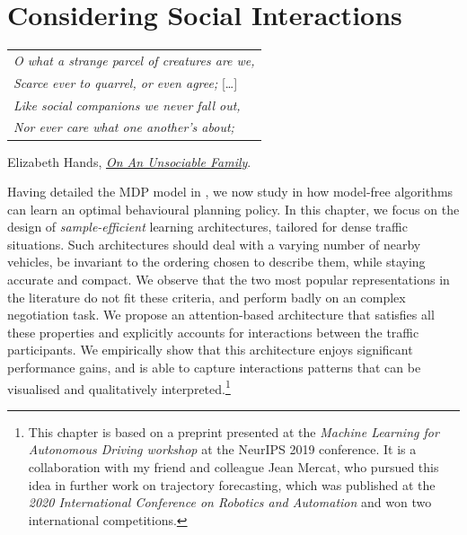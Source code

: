 
\graphicspath{{2-Chapters/4-Chapter/}}


\chapter{Considering Social Interactions}
\label{chapter:4}


\begin{flushright}
	\begin{tabular}{@{}l@{}}
		\emph{O what a strange parcel of creatures are we,}\\
		\emph{Scarce ever to quarrel, or even agree;} [\dots]\\
		\emph{Like social companions we never fall out,}\\
		\emph{Nor ever care what one another’s about;}\\
	\end{tabular}
	
	Elizabeth Hands, \href{https://eleurent.github.io/sisyphe/texts/unsociable_family.html}{\emph{On An Unsociable Family}}.
\end{flushright}

\abstractStartChapter{}%
Having detailed the \gls{MDP} model in , we now study in  how \gls{model-free}  algorithms can learn an optimal behavioural planning policy. In this chapter, we focus on the design of \emph{sample-efficient} learning architectures, tailored for dense traffic situations. Such architectures should deal with a varying number of nearby vehicles, be invariant to the ordering chosen to describe them, while staying accurate and compact. We observe that the two most popular representations in the literature do not fit these criteria, and perform badly on an complex negotiation task. We propose an attention-based architecture that satisfies all these properties and explicitly accounts for interactions between the traffic participants. We empirically show that this architecture enjoys significant performance gains, and is able to capture interactions patterns that can be visualised and qualitatively interpreted.\footnote{This chapter is based on a preprint \citep{Leurent2019social} presented at the \emph{Machine Learning for Autonomous Driving workshop} at the NeurIPS 2019 conference. It is a collaboration with my friend and colleague Jean Mercat, who pursued this idea in further work on trajectory forecasting, which was published at the \emph{2020 International Conference on Robotics and Automation} \citep{Mercat2020} and won two international competitions.}
\minitocStartChapter{}

